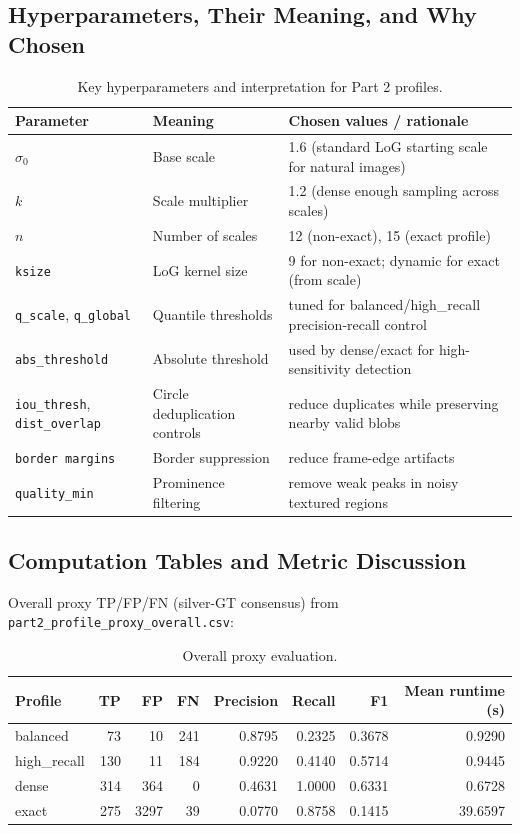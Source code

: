{\subsection*{Hyperparameters, Their Meaning, and Why Chosen}
\label{sec:p2-hyperparams}
\begin{table}[htbp]
\centering
\scriptsize
\begin{tabular}{l|l|l}
\hline
Parameter & Meaning & Chosen values / rationale\\
\hline
$\sigma_0$ & Base scale & 1.6 (standard LoG starting scale for natural images)\\
$k$ & Scale multiplier & 1.2 (dense enough sampling across scales)\\
$n$ & Number of scales & 12 (non-exact), 15 (exact profile)\\
\texttt{ksize} & LoG kernel size & 9 for non-exact; dynamic for exact (from scale)\\
\texttt{q\_scale}, \texttt{q\_global} & Quantile thresholds & tuned for balanced/high\_recall precision-recall control\\
\texttt{abs\_threshold} & Absolute threshold & used by dense/exact for high-sensitivity detection\\
\texttt{iou\_thresh}, \texttt{dist\_overlap} & Circle deduplication controls & reduce duplicates while preserving nearby valid blobs\\
\texttt{border margins} & Border suppression & reduce frame-edge artifacts\\
\texttt{quality\_min} & Prominence filtering & remove weak peaks in noisy textured regions\\
\hline
\end{tabular}
\caption{Key hyperparameters and interpretation for Part 2 profiles.}
\label{tab:p2-hyperparams}
\end{table}

\subsection*{Computation Tables and Metric Discussion}
\label{sec:p2-metrics}
Overall proxy TP/FP/FN (silver-GT consensus) from \texttt{part2\_profile\_proxy\_overall.csv}:
\begin{table}[htbp]
\centering
\small
\begin{tabular}{l|r|r|r|r|r|r|r}
\hline
Profile & TP & FP & FN & Precision & Recall & F1 & Mean runtime (s)\\
\hline
balanced & 73 & 10 & 241 & 0.8795 & 0.2325 & 0.3678 & 0.9290\\
high\_recall & 130 & 11 & 184 & 0.9220 & 0.4140 & 0.5714 & 0.9445\\
dense & 314 & 364 & 0 & 0.4631 & 1.0000 & 0.6331 & 0.6728\\
exact & 275 & 3297 & 39 & 0.0770 & 0.8758 & 0.1415 & 39.6597\\
\hline
\end{tabular}
\caption{Overall proxy evaluation.}
\label{tab:p2-overall}
\end{table}

}
